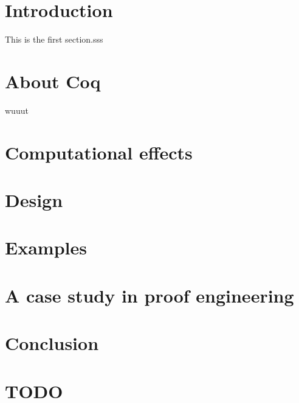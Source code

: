 \documentclass[declaration,inz,english,shortabstract]{iithesis}
\author         {Zeimer}
\date           {czerwiec 2019}                     %
\begin{document}

\chapter{Introduction}
 
This is the first section.sss

\chapter{About Coq}

wuuut

\chapter{Computational effects}

\chapter{Design}

\chapter{Examples}

\chapter{A case study in proof engineering}

\chapter{Conclusion}

\chapter{TODO}
\end{document}
